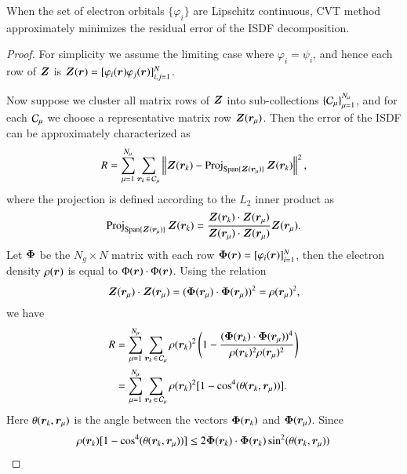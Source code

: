 \begin{theorem}
  When the set of electron orbitals $\{\varphi_i\}$ are Lipschitz continuous,
  CVT method approximately minimizes the residual error of the ISDF
  decomposition.
\end{theorem}
\begin{proof}
  For simplicity we assume the limiting case where $\varphi_{i}=\psi_{i}$, and
  hence each row of $\bm{Z}$ is $\bm{Z}(\bm{r})=[\varphi_{i}(\bm{r})\varphi_{j}(\bm{r})]_
  {i,j=1}^N$.

  Now suppose we cluster all matrix rows of $\bm{Z}$ into sub-collections $
  \{\mathcal{C}_\mu\}_{\mu=1}^{N_\mu}$, and for each $\mathcal{C}_\mu$ we choose a
  representative matrix row $\bm{Z}(\bm{r}_\mu)$. Then the error of the ISDF can be
  approximately characterized as
  \begin{equation}\label{eqn:ISDFerror}
    R = \sum_{\mu = 1}^{N_\mu}\sum_{\bm{r}_k\operatorname{\in} \mathcal{C}_\mu}\left\lVert\bm{Z}(\bm{r}_k)-
    \operatorname{Proj}_{\operatorname{Span}\{\bm{Z}(\bm{r}_{\mu})\}}\bm{Z}(\bm{r}_k)\right\rVert^2,
  \end{equation}
  where the projection is defined according to the $L_2$ inner product as
  \begin{equation}\label{eqn:Zprojection}
    \operatorname{Proj}_{\operatorname{Span}\{\bm{Z}(\bm{r}_{\mu})\}}\bm{Z}(\bm{r}_k) = \frac{\bm{Z}(\bm{r}_{k})\cdot \bm{Z}
    (\bm{r}_\mu)}{\bm{Z}(\bm{r}_\mu)\cdot \bm{Z}(\bm{r}_\mu)}\bm{Z}(\bm{r}_{\mu}).
  \end{equation}
  Let $\bm{\Phi}$ be the $N_{g} \times N$ matrix with each row $\bm{\Phi}(\bm{r}) = 
  [\varphi_i(\bm{r})]_{i=1}^N$, then the electron density $\rho(\bm{r})$ is equal to
  $\Phi(\bm{r})\cdot \Phi(\bm{r})$. Using the relation
  \begin{equation}\label{eqn:ZtoPhi}
    \bm{Z}(\bm{r}_\mu)\cdot \bm{Z}(\bm{r}_\mu) = (\bm{\Phi}(\bm{r}_{\mu})\cdot \bm{\Phi}(\bm{r}_{\mu}))^2
    = \rho(\bm{r}_{\mu})^2,
  \end{equation}
  we have
  \begin{align}
    R &= \sum_{\mu=1}^{N_\mu}\sum_{\bm{r}_k\operatorname{\in} \mathcal{C}_\mu}\rho(\bm{r}_k)^2 \left(1-
    \frac{(\bm{\Phi}(\bm{r}_{k})\cdot\bm{\Phi}(\bm{r}_{\mu}))^4}{\rho(\bm{r}_k)^2\rho
    (\bm{r}_\mu)^2}\right)\\
    &= \sum_{\mu=1}^{N_\mu}\sum_{\bm{r}_k\operatorname{\in} \mathcal{C}_\mu}\rho(\bm{r}_k)^2 [1-\cos^4
    (\theta(\bm{r}_k,\bm{r}_\mu))].
  \end{align}
  Here $\theta(\bm{r}_{k},\bm{r}_{\mu})$ is the angle between the vectors $\bm{\Phi}(\bm{r}_
  {k})$ and $\bm{\Phi}(\bm{r}_{\mu})$. Since
  \begin{align}
    \rho(\Br_k) [1-\cos^4(\theta(\Br_k,\Br_\mu))] &\Leq 2 \BPhi(\Br_{k})\cdot
    \BPhi(\Br_{k})\sin^{2}(\theta(\Br_k,\Br_\mu)) \\

\end{align}
\end{proof}
